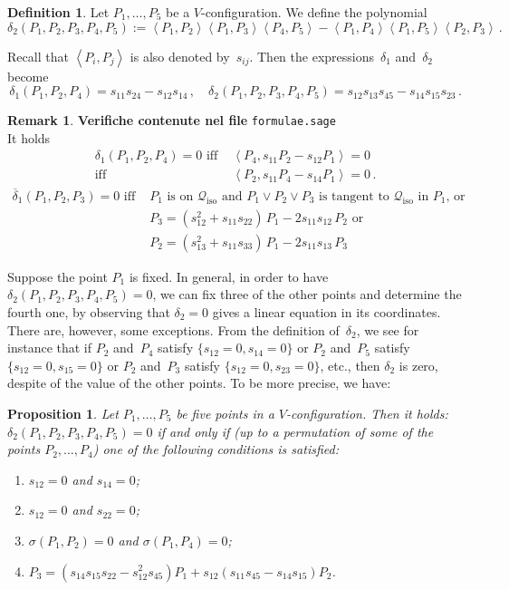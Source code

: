 \documentclass{amsart}
\theoremstyle{plain}
\newtheorem{prop}[lemma]{Proposition}
\theoremstyle{definition}
\newtheorem{definition}[lemma]{Definition}
\newtheorem{rmk}[lemma]{Remark}
\newcommand{\iso}{\mathcal{Q}_{\mathrm{iso}}}
\newcommand{\scl}[2]{\left\langle {#1}, {#2} \right\rangle}
\begin{document}
\begin{definition}
Let $P_1, \dots, P_5$ be a $V$-configuration.
We define the polynomial
%
\[
  \delta_2(P_1, P_2, P_3, P_4, P_5) :=
  \scl{P_1}{P_2} \scl{P_1}{P_3} \scl{P_4}{P_5} -
  \scl{P_1}{P_4} \scl{P_1}{P_5} \scl{P_2}{P_3} \,.
\]
%
\end{definition}

Recall that $\scl{P_i}{P_j}$ is also denoted by~$s_{ij}$.
Then the expressions~$\delta_1$ and~$\delta_2$ become
%
\[
  \delta_1(P_1, P_2, P_4) = s_{11} s_{24}-s_{12}s_{14} \,, \quad
  \delta_2(P_1, P_2, P_3, P_4, P_5) = s_{12}s_{13}s_{45}-s_{14}s_{15} s_{23} \,.
\]
%
\begin{rmk}
\label{rmk:characteristics_d1_d2}
\textbf{Verifiche contenute nel file} \verb+formulae.sage+ \\
It holds
%
\begin{align}
\label{rmk_delta_case1}
  \delta_1(P_1, P_2, P_4) = 0 \mbox{ iff } &\scl{P_4}{s_{11}P_2-s_{12}P_1} = 0\\
  \mbox{iff } &\scl{P_2}{s_{11}P_4-s_{14}P_1} = 0 \,. \nonumber
\end{align}
%
\begin{align}
\label{rmk_delta_case2}
  \overline{\delta}_1(P_1, P_2, P_3) = 0 \mbox{ iff } &
  P_1 \mbox{ is on~$\iso$ and } P_1 \vee P_2 \vee P_3 \mbox{ is tangent to~$\iso$ in $P_1$, or} \\
  & P_3 = (s_{12}^2+s_{11}s_{22}) \, P_1 - 2s_{11}s_{12} \, P_2 \mbox{ or} \nonumber \\
  & P_2 = (s_{13}^2+s_{11}s_{33}) \, P_1 - 2s_{11}s_{13} \, P_3 \nonumber
\end{align}
%
\end{rmk}

Suppose the point $P_1$ is fixed. In general, in order to have
$\delta_2(P_1, P_2, P_3, P_4, P_5) = 0$, we can fix three of the other points and determine the fourth one, 
by observing that $\delta_2=0$ gives a linear equation in its coordinates.
There are, however, some exceptions. 
From the definition of~$\delta_2$, we see for instance that
if $P_2$ and~$P_4$ satisfy $\{s_{12}=0, s_{14}=0\}$ or $P_2$ and~$P_5$ satisfy $\{s_{12}=0, s_{15}=0\}$ or $P_2$ and~$P_3$ satisfy
$\{s_{12}=0, s_{23}=0\}$, etc., then $\delta_2$ is zero,
despite of the value of the other points.
To be more precise, we have:
%
\begin{prop}
\label{prop:definitionP3}
Let $P_1, \dots, P_5$ be five points in a $V$-configuration. Then it holds:
$\delta_2(P_1, P_2, P_3, P_4, P_5) = 0$ if and only if (up to a permutation
of some of the points $P_2, \dots, P_4$) one of the following conditions
is satisfied:
%
\begin{enumerate}
  \item $s_{12} = 0$ and $s_{14} = 0$;
  \label{defP3_1}
  \item $s_{12} = 0$ and $s_{22} = 0$;
  \label{defP3_2}
  \item $\sigma(P_1, P_2) = 0$ and $\sigma(P_1, P_4) = 0$;
  \label{defP3_3}
  \item $P_3 = (s_{14}s_{15}s_{22}-s_{12}^2s_{45})P_1  +s_{12}(s_{11}s_{45}-s_{14}s_{15})P_2$.
  \label{defP3_4}
\end{enumerate}
%
\end{prop}
\end{document}
